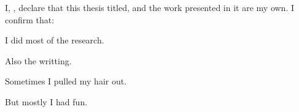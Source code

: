 \documentclass[
11pt, %
oneside, %
english, %
singlespacing, %
]{macthesis} %
\begin{document}
\tableofcontents %

\listoffigures %

\listoftables %



\begin{declaration}
\addchaptertocentry{\authorshipname}

\noindent I, \authorname, declare that this thesis titled, \emph{\ttitle} and the work presented in it are my own. I confirm that:

I did most of the research.

Also the writting.

Sometimes I pulled my hair out.

But mostly I had fun.

\end{declaration}


\label{lastoffront}
\clearpage

\end{document}
